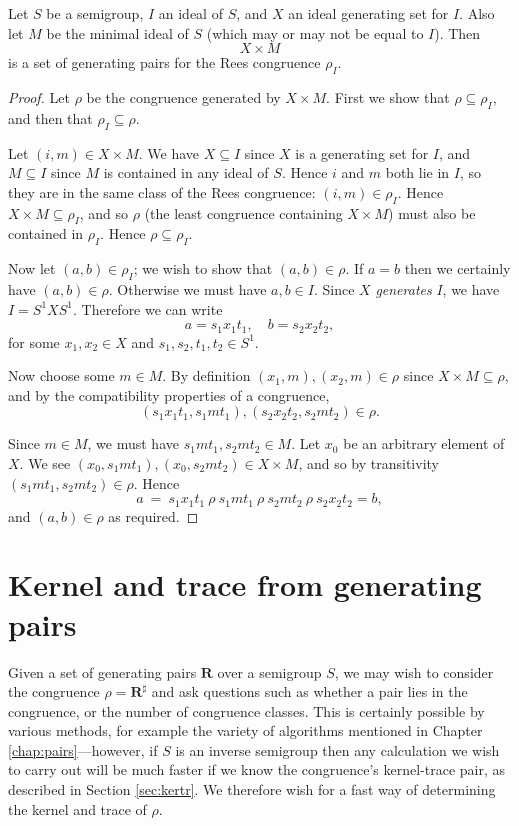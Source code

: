 \begin{theorem}
  Let $S$ be a semigroup, $I$ an ideal of $S$, and $X$ an ideal generating set
  for $I$.  Also let $M$ be the minimal ideal of $S$ (which may or may not be
  equal to $I$).  Then $$X \times M$$ is a set of generating pairs for the Rees
  congruence $\rho_I$.
  \begin{proof}
    Let $\rho$ be the congruence generated by $X \times M$.  First we show that
    $\rho \subseteq \rho_I$, and then that $\rho_I \subseteq \rho$.

    Let $(i,m) \in X \times M$.  We have $X \subseteq I$ since $X$ is a
    generating set for $I$, and $M \subseteq I$ since $M$ is contained in any
    ideal of $S$.  Hence $i$ and $m$ both lie in $I$, so they are in the same
    class of the Rees congruence: $(i,m) \in \rho_I$.  Hence $X \times M
    \subseteq \rho_I$, and so $\rho$ (the least congruence containing $X \times
    M$) must also be contained in $\rho_I$.  Hence $\rho \subseteq \rho_I$.

    Now let $(a,b) \in \rho_I$; we wish to show that $(a,b) \in \rho$.  If $a=b$
    then we certainly have $(a,b) \in \rho$.  Otherwise we must have $a,b \in
    I$.  Since $X$ \textit{generates} $I$, we have $I = S^1XS^1$.  Therefore we
    can write
    $$a = s_1x_1t_1, \quad b = s_2x_2t_2,$$
    for some $x_1,x_2 \in X$ and $s_1,s_2,t_1,t_2 \in S^1$.

    Now choose some $m \in M$.  By definition $(x_1,m), (x_2,m) \in \rho$ since
    $X \times M \subseteq \rho$, and
    by the compatibility properties of a congruence,
    $$(s_1x_1t_1,s_1mt_1), (s_2x_2t_2,s_2mt_2) \in \rho.$$

    Since $m \in M$, we must have $s_1mt_1,s_2mt_2 \in M$.  Let $x_0$ be an
    arbitrary element of $X$.
    We see $(x_0,s_1mt_1), (x_0,s_2mt_2) \in X \times M$, and so by transitivity
    $(s_1mt_1, s_2mt_2) \in \rho$.
    Hence
    $$a ~=~ s_1x_1t_1 ~\rho~ s_1mt_1 ~\rho~ s_2mt_2 ~\rho~ s_2x_2t_2 = b,$$
    and $(a,b) \in \rho$ as required.
  \end{proof}
\end{theorem}

\section{Kernel and trace from generating pairs}
\label{sec:pairs-to-kertr}

Given a set of generating pairs $\mathbf{R}$ over a semigroup $S$, we may wish
to consider the congruence $\rho = \mathbf{R}^\sharp$ and ask questions such as
whether a pair lies in the congruence, or the number of congruence classes.
This is certainly possible by various methods, for example the variety of
algorithms mentioned in Chapter \ref{chap:pairs}---however, if $S$ is an inverse
semigroup then any calculation we wish to carry out will be much faster if we
know the congruence's kernel-trace pair, as described in Section
\ref{sec:kertr}.  We therefore wish for a fast way of determining the kernel and
trace of $\rho$.

